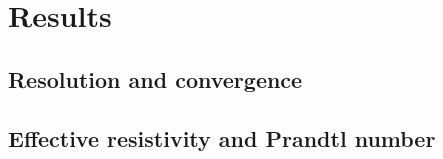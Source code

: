 \documentclass[preprint2]{aastex63}
\begin{document}
\section{Results} \label{sec:results}

\subsection{{Resolution and convergence}} \label{sec:conv}
\subsection{{Effective resistivity and Prandtl number}} \label{sec:eta}
\end{document}
